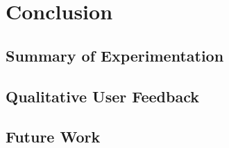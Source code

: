 \documentclass[12pt]{report}
\begin{document}
\chapter{Conclusion} \label{chap:concl}


\section{Summary of Experimentation} \label{sec:summexper}

\section{Qualitative User Feedback} \label{sec:qual}

\section{Future Work} \label{sec:future}





\nocite{travisdiss}
\nocite{travisshort}
\nocite{calgary}

\end{document}
